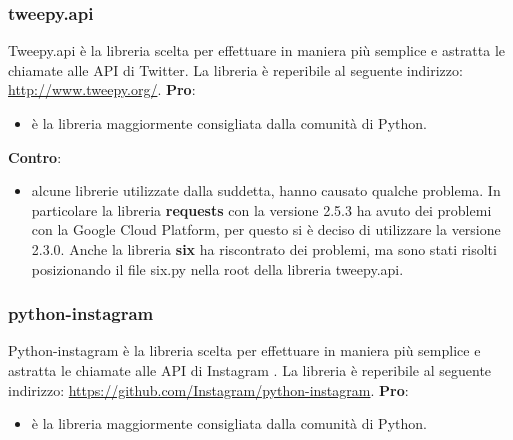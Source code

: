 		\subsubsection{tweepy.api} %
		\label{ssub:tweetpy}
		Tweepy.api è la libreria scelta per effettuare in maniera più semplice e astratta le chiamate alle API di Twitter. La libreria è reperibile al seguente indirizzo: \url{http://www.tweepy.org/}. \newline
		\textbf{Pro}:
			\begin{itemize}
				\item è la libreria maggiormente consigliata dalla comunità di Python.
			\end{itemize}
		\noindent
		\textbf{Contro}:
			\begin{itemize}
				\item alcune librerie utilizzate dalla suddetta, hanno causato qualche problema. In particolare la libreria \textbf{requests} con la versione 2.5.3 ha avuto dei problemi con la Google Cloud Platform, per questo si è deciso di utilizzare la versione 2.3.0. Anche la libreria \textbf{six} ha riscontrato dei problemi, ma sono stati risolti posizionando il file six.py nella root della libreria tweepy.api.
			\end{itemize}
		\noindent

		\subsubsection{python-instagram} %
		\label{ssub:python_instagram}
		Python-instagram è la libreria scelta per effettuare in maniera più semplice e astratta le chiamate alle API di Instagram . La libreria è reperibile al seguente indirizzo: \url{https://github.com/Instagram/python-instagram}. \newline
		\textbf{Pro}:
			\begin{itemize}
				\item è la libreria maggiormente consigliata dalla comunità di Python.
			\end{itemize}
		\noindent

